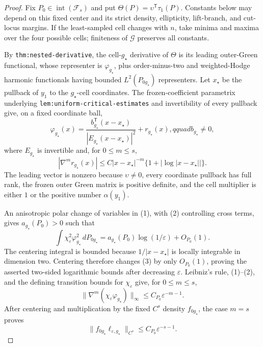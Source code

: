 \documentclass{article}
\begin{document}
\begin{proof}
Fix \(P_0\in\operatorname{int}(\mathcal F_s)\) and put
\(\Theta(P)=\upsilon^{\mathsf T}\tau_1(P)\).  Constants below may depend on this fixed center and its strict density, ellipticity, lift-branch, and cut-locus margins.  If the least-sampled cell changes with \(n\), take minima and maxima over the four possible cells; finiteness of \(\mathcal G\) preserves all constants.

By \texttt{thm:nested-derivative}, the cell-\(g_\star\) derivative of \(\Theta\) is its leading outer-Green functional, whose representer is \(\varphi_{g_\star}\), plus order-minus-two and weighted-Hodge harmonic functionals having bounded \(L^2(P_{0g_\star})\) representers.  Let \(x_\star\) be the pullback of \(y_1\) to the \(g_\star\)-cell coordinates.  The frozen-coefficient parametrix underlying \texttt{lem:uniform-critical-estimates} and invertibility of every pullback give, on a fixed coordinate ball,
\[
 \varphi_{g_\star}(x)=
 \frac{b_{g_\star}^{\mathsf T}(x-x_\star)}
 {|E_{g_\star}(x-x_\star)|^2}+r_{g_\star}(x),qquad b_{g_\star}\neq0, \tag{1}
\]
where \(E_{g_\star}\) is invertible and, for \(0\leq m\leq s\),
\[
 |\nabla^m r_{g_\star}(x)|
 \leq C|x-x_\star|^{-m}\{1+|\log|x-x_\star||\}.                     \tag{2}
\]
The leading vector is nonzero because \(\upsilon\neq0\), every coordinate pullback has full rank, the frozen outer Green matrix is positive definite, and the cell multiplier is either \(1\) or the positive number \(\alpha(y_1)\).

An anisotropic polar change of variables in (1), with (2) controlling cross terms, gives \(a_{g_\star}(P_0)>0\) such that
\[
 \int\chi_\varepsilon^2\varphi_{g_\star}^2\,dP_{0g_\star}
 =a_{g_\star}(P_0)\log(1/\varepsilon)+O_{P_0}(1).                     \tag{3}
\]
The centering integral is bounded because \(1/|x-x_\star|\) is locally integrable in dimension two.  Centering therefore changes (3) by only \(O_{P_0}(1)\), proving the asserted two-sided logarithmic bounds after decreasing \(\varepsilon\).  Leibniz's rule, (1)--(2), and the defining transition bounds for \(\chi_\varepsilon\) give, for \(0\leq m\leq s\),
\[
 \|\nabla^m(\chi_\varepsilon\varphi_{g_\star})\|_\infty
 \leq C_{P_0}\varepsilon^{-m-1}.                                     \tag{4}
\]
After centering and multiplication by the fixed \(C^s\) density \(f_{0g_\star}\), the case \(m=s\) proves
\[
 \|f_{0g_\star}\ell_{\varepsilon,g_\star}\|_{C^s}
 \leq C_{P_0}\varepsilon^{-s-1}.                                     \tag{5}
\]


\end{proof}
\end{document}
